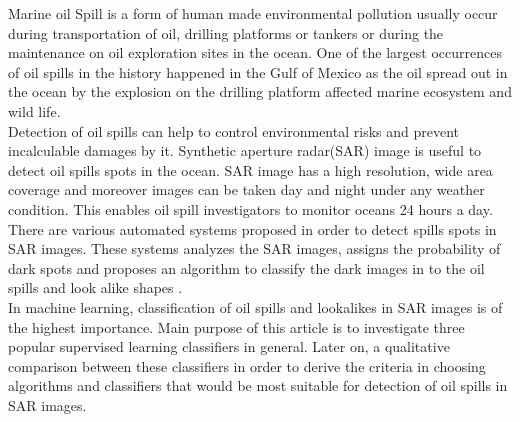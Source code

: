 Marine oil Spill is a form of human made environmental pollution usually occur during transportation of oil, drilling platforms or tankers \cite{Zhang201476}or during the maintenance on oil exploration sites in the ocean. One of the largest occurrences of oil spills in the history happened in the Gulf of Mexico as the oil spread out in the ocean by the explosion on the drilling platform affected marine ecosystem and wild life\cite{Bozeman2011244}.\\
Detection of oil spills can help to control environmental risks and prevent incalculable damages by it. Synthetic aperture radar(SAR) image is useful to detect oil spills spots in the ocean. SAR image has a high resolution, wide area coverage and moreover images can be taken day and night under any weather condition. This enables oil spill investigators to monitor oceans 24 hours a day\cite{Chang20081915}.\\
There are various automated systems proposed in order to detect spills spots in SAR images. These systems analyzes the SAR images, assigns the probability of dark spots and proposes an algorithm to classify the dark images in to the oil spills and look alike shapes \cite{Xu201414,brekke2008classifiers,Keramitsoglou2006640,Guo2014146}.\\
In machine learning, classification of oil spills and lookalikes in SAR images is of the highest importance. Main purpose of this article is to  investigate three popular supervised learning classifiers in general. Later on, a qualitative comparison between these classifiers in order to derive the criteria in choosing algorithms and classifiers that would be most suitable for detection of oil spills in SAR images. 